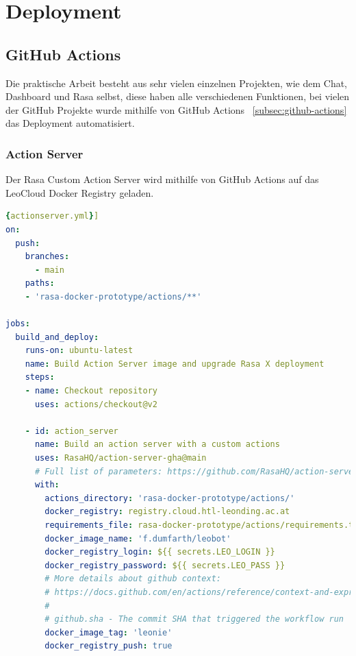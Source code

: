 \section{Deployment}

\subsection{GitHub Actions}

Die praktische Arbeit besteht aus sehr vielen einzelnen Projekten, wie dem Chat, Dashboard und Rasa selbst, diese haben alle verschiedenen Funktionen, bei vielen der GitHub Projekte wurde mithilfe von GitHub Actions ~\ref{subsec:github-actions} das Deployment automatisiert.

\subsubsection{Action Server}
Der Rasa Custom Action Server wird mithilfe von GitHub Actions auf das LeoCloud Docker Registry geladen.

\begin{lstlisting}[language=yaml,label={lst:actionserveryml},caption={action\_server.yml}]{actionserver.yml}]
on:
  push:
    branches:
      - main
    paths:
    - 'rasa-docker-prototype/actions/**'

jobs:
  build_and_deploy:
    runs-on: ubuntu-latest
    name: Build Action Server image and upgrade Rasa X deployment
    steps:
    - name: Checkout repository
      uses: actions/checkout@v2

    - id: action_server
      name: Build an action server with a custom actions
      uses: RasaHQ/action-server-gha@main
      # Full list of parameters: https://github.com/RasaHQ/action-server-gha/tree/master#input-arguments
      with:
        actions_directory: 'rasa-docker-prototype/actions/'
        docker_registry: registry.cloud.htl-leonding.ac.at
        requirements_file: rasa-docker-prototype/actions/requirements.txt
        docker_image_name: 'f.dumfarth/leobot'
        docker_registry_login: ${{ secrets.LEO_LOGIN }}
        docker_registry_password: ${{ secrets.LEO_PASS }}
        # More details about github context:
        # https://docs.github.com/en/actions/reference/context-and-expression-syntax-for-github-actions#github-context
        #
        # github.sha - The commit SHA that triggered the workflow run
        docker_image_tag: 'leonie'
        docker_registry_push: true
\end{lstlisting}

